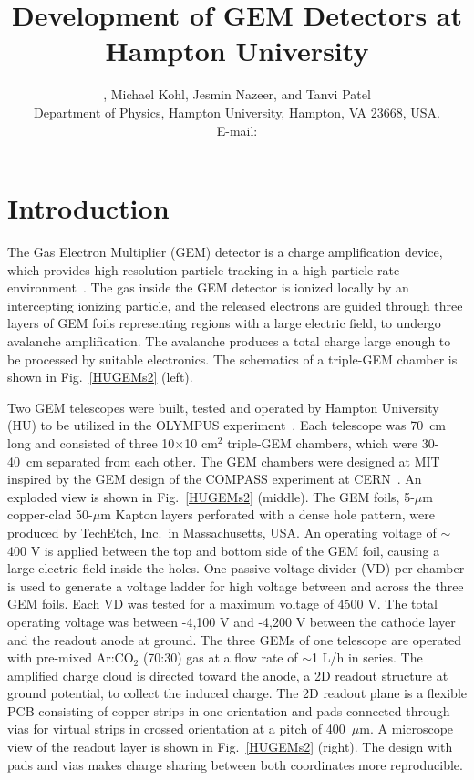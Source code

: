 \documentclass{PoS}
\title{Development of GEM Detectors at Hampton University}
\author{\speaker{Anusha Liyanage}, Michael Kohl, Jesmin Nazeer, and Tanvi
  Patel\\
       Department of Physics, Hampton University, Hampton, VA 23668, USA.\\ 
        E-mail: \email{anusha@jlab.org}}
\begin{document}
\section{Introduction}

The Gas Electron Multiplier (GEM) detector is a charge amplification device,
which provides high-resolution particle tracking in a high particle-rate
environment~\cite{GEM_sauli}. The gas inside the GEM detector is ionized
locally by an intercepting ionizing particle, and the released electrons are
guided through three layers of GEM foils representing regions with a large
electric field, to undergo avalanche amplification.
The avalanche produces %
a total charge large enough to be processed by suitable electronics.
The schematics of a triple-GEM chamber is shown in Fig.~\ref{HUGEMs2} (left).

Two GEM telescopes were built, tested and operated by Hampton University (HU) to
be utilized in the OLYMPUS experiment~\cite{OLYMPUS, hendersonH, ozgur}.
Each telescope was 70~cm long and consisted of three 10$\times$10 cm$^2$
triple-GEM chambers, which were 30-40~cm separated from each other.
The GEM chambers were designed at MIT inspired by the GEM design of the
COMPASS experiment at CERN~\cite{COMPASS}. An exploded view is shown in
Fig.~\ref{HUGEMs2} (middle).
The GEM foils, 5-$\mu$m copper-clad 50-$\mu$m Kapton layers perforated with a
dense hole pattern, were produced by TechEtch, Inc.~in Massachusetts, USA.
An operating voltage of $\sim$400 V is applied between the top and
bottom side of the GEM foil, causing a large electric field inside the holes.
One passive voltage divider (VD) per chamber is used to generate a voltage
ladder for high voltage between and across the three GEM foils.
Each VD was tested for a maximum voltage of 4500 V.
The total operating voltage was between -4,100 V and -4,200 V between the
cathode layer and the readout anode at ground.
The three GEMs of one telescope are operated with pre-mixed Ar:CO$_2$ (70:30)
gas at a flow rate of $\sim$1 L/h in series.
The amplified charge cloud is directed toward the anode, a 2D readout
structure at ground potential, to collect the induced charge.
The 2D readout plane is a flexible PCB consisting of copper strips in one
orientation and pads connected through vias for virtual strips in crossed
orientation at a pitch of 400~$\mu$m. A microscope view of the readout layer
is shown in Fig.~\ref{HUGEMs2} (right). The design with pads and vias %
makes charge sharing between both coordinates more reproducible.
\end{document}
